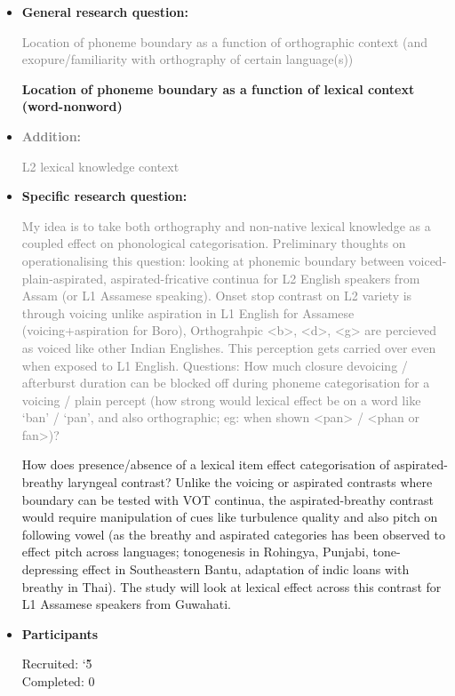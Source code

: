 \documentclass[12pt, english]{article}
\begin{document}
\begin{itemize}
    \item \textbf{General research question:} \par
    \textcolor{gray}{Location of phoneme boundary as a function of orthographic context (and exopure/familiarity with orthography of certain language(s))} \par
    \textbf{Location of phoneme boundary as a function of lexical context (word-nonword)}
    \item \textbf{\textcolor{gray}{Addition:}} \par
    \textcolor{gray}{L2 lexical knowledge context}
    \item \textbf{Specific research question:} \par
    \textcolor{gray}{My idea is to take both orthography and non-native lexical knowledge as a coupled effect on phonological categorisation. Preliminary thoughts on operationalising this question: looking at phonemic boundary between voiced-plain-aspirated, aspirated-fricative continua for L2 English speakers from Assam (or L1 Assamese speaking). Onset stop contrast on L2 variety is through voicing unlike aspiration in L1 English for Assamese (voicing+aspiration for Boro), Orthograhpic <b>, <d>, <g> are percieved as voiced like other Indian Englishes. This perception gets carried over even when exposed to L1 English. Questions: How much closure devoicing / afterburst duration can be blocked off during phoneme categorisation for a voicing / plain percept (how strong would lexical effect be on a word like `ban' / `pan', and also orthographic; eg: when shown <pan> / <phan or fan>)?} \par
    How does presence/absence of a lexical item effect categorisation of aspirated-breathy laryngeal contrast? Unlike the voicing or aspirated contrasts where boundary can be tested with VOT continua, the aspirated-breathy contrast would require manipulation of cues like turbulence quality and also pitch on following vowel (as the breathy and aspirated categories has been observed to effect pitch across languages; tonogenesis in Rohingya, Punjabi, tone-depressing effect in Southeastern Bantu, adaptation of indic loans with breathy in Thai). The study will look at lexical effect across this contrast for L1 Assamese speakers from Guwahati.       
    \item \textbf{Participants} \par
    Recruited: \char`\~ 5 \\
    Completed: 0 \par

\end{itemize}
\end{document}
